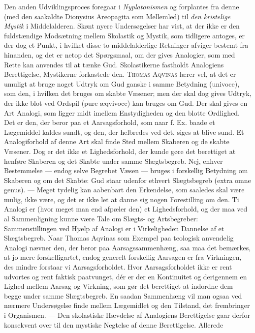\documentclass[12pt,a4paper,openany]{book}
\newcommand{\opage}[1]{\marginnote{\footnotesize\textit{[#1]}}}
\begin{document}
Den anden Udviklingsproces foregaar i \textit{Nyplatonismen} og
forplantes fra denne (med den saakaldte Dionysius Areopagita som
Mellemled) til \textit{den kristelige Mystik} i Middelalderen. Skønt
nyere Undersøgelser har vist, at der ikke er den fuldstændige Modsætning
mellem Skolastik og Mystik, som tidligere antoges, er der dog et Punkt,
i hvilket disse to middelalderlige Retninger afviger bestemt fra
hinanden, og det er netop det Spørgsmaal, om der gives Analogier, som
med Rette kan anvendes til at tænke Gud. Skolastikerne fastholdt
Analogiens Berettigelse, Mystikerne forkastede den. \textsc{Thomas
Aqvinas} lærer vel, at det er umuligt at bruge noget Udtryk om Gud
ganske i samme Betydning (univoce), som den, i hvilken det bruges om
skabte Væsener; men der skal dog gives Udtryk, der ikke blot ved Ordspil
(pure æqvivoce) kan bruges om Gud. Der skal gives en Art Analogi, som
ligger midt imellem Enstydigheden og den blotte Ordlighed. Det er den,
der beror paa et Aarsagsforhold, som naar f. Ex. baade et Lægemiddel
kaldes sundt, og den, der helbredes ved det, siges at blive sund. Et
Analogiforhold af denne Art skal finde Sted mellem Skaberen og de skabte
Væsener. Dog er det ikke et Lighedsforhold, der kunde gøre det
berettiget at henføre Skaberen og det Skabte under samme Slægtsbegreb.
Nej, enhver Bestemmelse --- endog selve Begrebet Væsen --- bruges i
forskellig Betydning om Skaberen og om det Skabte: Gud staar udenfor
ethvert Slægtsbegreb (extra omne genus). --- Meget tydelig kan aabenbart
den Erkendelse, som saaledes skal være mulig, ikke være, og det er ikke
let at danne sig nogen Forestilling om den. Ti Analogi er (hvor meget
man end afpæler den) et Lighedsforhold, og der maa ved al Sammenligning
kunne være Tale om Slægts- og Artsbegreber: Sammenstillingen ved Hjælp
af Analogi er i Virkeligheden Dannelse af et Slægtsbegreb. Naar Thomas
Aqvinas som Exempel paa teologisk anvendelig Analogi nævner den, der
beror paa Aarsagssammenhæng, saa maa det bemærkes, at jo mere
forskelligartet, endog generelt forskellig Aarsagen er fra Virkningen,
des mindre forstaar vi Aarsagsforholdet. Hvor Aarsagsforholdet ikke er
rent udvortes og rent faktisk paatvunget, dér er der en Kontinuitet
\opage{43}og derigennem en Lighed mellem Aarsag og Virkning, som gør det
berettiget at indordne dem begge under samme Slægtsbegreb. En saadan
Sammenhæng vil man ogsaa ved nærmere Undersøgelse finde mellem
Lægemidlet og den Tilstand, det frembringer i Organismen. --- Den
skolastiske Hævdelse af Analogiens Berettigelse gaar derfor konsekvent
over til den mystiske Negtelse af denne Berettigelse. Allerede
\end{document}
